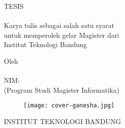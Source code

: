 
\begin{spacing}{1}
\begin{center}
    \smallskip
    \thispagestyle{empty}
    \large \bfseries \MakeUppercase{\Title}

    \vfill\vfill

    \large TESIS\\
    \hfill\\
    \normalsize Karya tulis sebagai salah satu syarat\\
    untuk memperoleh gelar Magister dari\\
    Institut Teknologi Bandung

    \vfill

    \normalsize Oleh\\
    \large \MakeUppercase{\AuthorName}\\
    NIM:~\MakeUppercase{\AuthorNIM}\\
    (Program Studi Magister Informatika)

    \vfill

    \begin{figure}[h]
        \centering
        \texttt{[image: cover-ganesha.jpg]}
    \end{figure}

    \vfill\vfill

    \large
    \MakeUppercase{Institut Teknologi Bandung} \\
    \ThesisMonthYear

\end{center}
\end{spacing}
